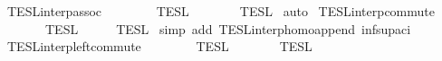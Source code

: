 \begin{isabellebody}
{\isafoldproof}%
%
\isadelimproof
%
\endisadelimproof
%
\isadelimdocument
%
\endisadelimdocument
%
\isatagdocument
%
\isamarkuptrue%
%
\endisatagdocument
{\isafolddocument}%
%
\isadelimdocument
%
\endisadelimdocument
{}\isamarkupfalse%
\ TESL{\isacharunderscore}interp{\isacharunderscore}assoc{\isacharcolon}\isanewline
\ \ {\isacartoucheopen}{\isasymlbrakk}{\isasymlbrakk}\ {\isacharparenleft}{\isasymPhi}\ {\isacharat}\ {\isasymPhi}\ {\isacharat}\ {\isasymPhi}\ {\isasymrbrakk}{\isasymrbrakk}\isactrlsub T\isactrlsub E\isactrlsub S\isactrlsub L\ {\isacharequal}\ {\isasymlbrakk}{\isasymlbrakk}\ {\isasymPhi}\ {\isacharat}\ {\isacharparenleft}{\isasymPhi}\ {\isacharat}\ {\isasymPhi}\ {\isasymrbrakk}{\isasymrbrakk}\isactrlsub T\isactrlsub E\isactrlsub S\isactrlsub L{\isacartoucheclose}\isanewline
%
\isadelimproof
%
\endisadelimproof
%
\isatagproof
{}\isamarkupfalse%
\ auto%
\endisatagproof
{\isafoldproof}%
%
\isadelimproof
\isanewline
%
\endisadelimproof
\isanewline
{}\isamarkupfalse%
\ TESL{\isacharunderscore}interp{\isacharunderscore}commute{\isacharcolon}\isanewline
\ \ \ {\isacartoucheopen}{\isasymlbrakk}{\isasymlbrakk}\ {\isasymPhi}\ {\isacharat}\ {\isasymPhi}\ {\isasymrbrakk}{\isasymrbrakk}\isactrlsub T\isactrlsub E\isactrlsub S\isactrlsub L\ {\isacharequal}\ {\isasymlbrakk}{\isasymlbrakk}\ {\isasymPhi}\ {\isacharat}\ {\isasymPhi}\ {\isasymrbrakk}{\isasymrbrakk}\isactrlsub T\isactrlsub E\isactrlsub S\isactrlsub L{\isacartoucheclose}\isanewline
%
\isadelimproof
%
\endisadelimproof
%
\isatagproof
{}\isamarkupfalse%
\ {\isacharparenleft}simp\ add{\isacharcolon}\ TESL{\isacharunderscore}interp{\isacharunderscore}homo{\isacharunderscore}append\ inf{\isacharunderscore}sup{\isacharunderscore}aci{\isacharparenleft}{}{\isacharparenright}{\isacharparenright}%
\endisatagproof
{\isafoldproof}%
%
\isadelimproof
\isanewline
%
\endisadelimproof
\isanewline
{}\isamarkupfalse%
\ TESL{\isacharunderscore}interp{\isacharunderscore}left{\isacharunderscore}commute{\isacharcolon}\isanewline
\ \ {\isacartoucheopen}{\isasymlbrakk}{\isasymlbrakk}\ {\isasymPhi}\ {\isacharat}\ {\isacharparenleft}{\isasymPhi}\ {\isacharat}\ {\isasymPhi}\ {\isasymrbrakk}{\isasymrbrakk}\isactrlsub T\isactrlsub E\isactrlsub S\isactrlsub L\ {\isacharequal}\ {\isasymlbrakk}{\isasymlbrakk}\ {\isasymPhi}\ {\isacharat}\ {\isacharparenleft}{\isasymPhi}\ {\isacharat}\ {\isasymPhi}\ {\isasymrbrakk}{\isasymrbrakk}\isactrlsub T\isactrlsub E\isactrlsub S\isactrlsub L{\isacartoucheclose}\isanewline

\end{isabellebody}
